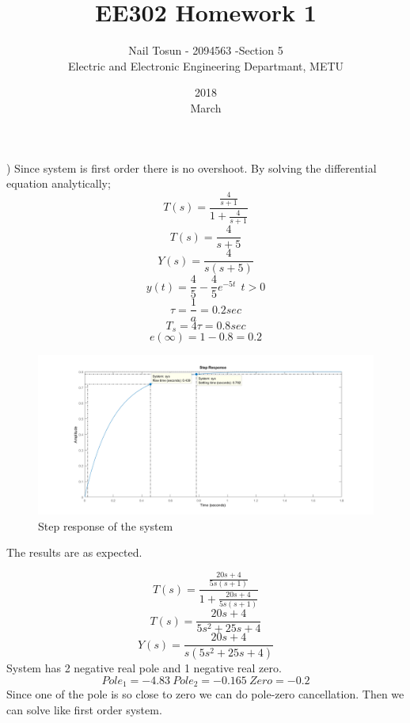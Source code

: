 \documentclass[11pt]{article}
\title{EE302 Homework 1}
\date{2018\\ March}
\author{Nail Tosun - 2094563 -Section 5\\ Electric and Electronic Engineering Departmant, METU}
\begin{document}
)
	Since system is first order there is no overshoot. By solving the differential equation analytically;
	$$T(s)=\frac{\frac{4}{s+1}}{1+\frac{4}{s+1}}$$
	$$T(s)=\frac{4}{s+5}$$
	$$Y(s)=\frac{4}{s(s+5)}$$
	$$y(t) = \frac{4}{5}-\frac{4}{5}e^{-5t} \> \> t>0 $$
	$$\tau=\frac{1}{a}=0.2 sec$$ 
	$$T_s=4\tau=0.8 sec$$
	$$e(\infty)=1-0.8=0.2$$ 
	

\begin{figure}[H]
  \includegraphics[scale=0.7, center]{step1}
  \caption{Step response of the system}
  \label{fig:zero}
\end{figure}
The results are as expected.

\[T(s)=\frac{\frac{20s+4}{5s(s+1)}}{1+\frac{20s+4}{5s(s+1)}}\]
\[T(s)=\frac{20s+4}{5s^2+25s+4}\]
\[Y(s)=\frac{20s+4}{s(5s^2+25s+4)}\]
System has 2 negative real pole and 1 negative real zero.
$$Pole_1=-4.83 \> Pole_2=-0.165 \> Zero=-0.2$$
Since one of the pole is so close to zero we can do pole-zero cancellation. Then we can solve like first order system.
\end{document}
